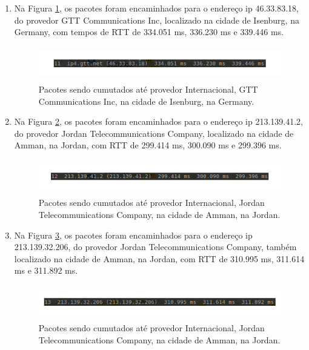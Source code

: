 \documentclass[
	article,			%
	11pt,				%
	oneside,			%
	a4paper,			%
	english,			%
	brazil,				%
	sumario=tradicional
	]{abntex2}
\begin{document}
\begin{enumerate}
	 	 \item Na Figura \ref{rota-11}, os pacotes foram encaminhados para o endereço ip 46.33.83.18, do provedor GTT Communications Inc, localizado na cidade de Isenburg, na Germany, com tempos de RTT de 334.051 ms, 336.230 ms e 339.446 ms.
	 	
	 	\begin{figure}[H]
	 		\centering
	 		\includegraphics[width=17cm,height=1.5cm]{./rota-11.png}
	 		\caption{Pacotes sendo cumutados até provedor Internacional, GTT Communications Inc, na cidade de Isenburg, na Germany.}
	 		\label{rota-11}
	 	\end{figure}
 	
	 	 \item Na Figura \ref{rota-12}, os pacotes foram encaminhados para o endereço ip 213.139.41.2, do provedor Jordan Telecommunications Company, localizado na cidade de Amman, na Jordan, com RTT de 299.414 ms, 300.090 ms e 299.396 ms.
	 	
	 	\begin{figure}[H]
	 		\centering
	 		\includegraphics[width=17cm,height=1.5cm]{./rota-12.png}
	 		\caption{Pacotes sendo cumutados até provedor Internacional, Jordan Telecommunications Company, na cidade de Amman, na Jordan.}
	 		\label{rota-12}
	 	\end{figure}
 	
	 	 \item Na Figura \ref{rota-13}, os pacotes foram encaminhados para o endereço ip 213.139.32.206, do provedor Jordan Telecommunications Company, também localizado na cidade de Amman, na Jordan, com RTT de 310.995 ms, 311.614 ms e 311.892 ms.
	 	
	 	\begin{figure}[H]
	 		\centering
	 		\includegraphics[width=17cm,height=1.5cm]{./rota-13.png}
	 		\caption{Pacotes sendo cumutados até provedor Internacional, Jordan Telecommunications Company, na cidade de Amman, na Jordan.}
	 		\label{rota-13}
	 	\end{figure}
 \end{enumerate}
\end{document}
